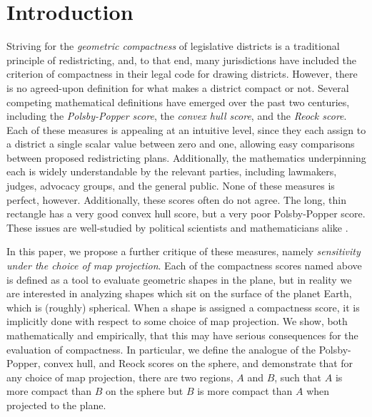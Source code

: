 \section{Introduction}\label{sec:intro}

Striving for the \textit{geometric compactness} of legislative
districts is a traditional principle of redistricting, and, to that
end, many jurisdictions have included the criterion of compactness in
their legal code for drawing districts.  However, there is no
agreed-upon definition for what makes a district compact or not.
Several competing mathematical definitions have emerged over the past
two centuries, including the \textit{Polsby-Popper score}, 
the \textit{convex hull score}, and the \textit{Reock score}.  
Each of these
measures is appealing at an intuitive level, since they each assign to
a district a single scalar value between zero and one, allowing easy
comparisons between proposed redistricting plans. Additionally, the
mathematics underpinning each is widely understandable by the relevant
parties, including lawmakers, judges, advocacy groups, and the general
public.  None of these measures is perfect, however\cit.
Additionally, these scores often do not agree.
The long, thin rectangle has a very good convex hull score, but a very
poor Polsby-Popper score.  These issues are well-studied by political
scientists and mathematicians alike
\cite{polsby1991third,frolov1975shape,maceachren1985compact}.

In this paper, we propose a further critique of these measures, namely
\textit{sensitivity under the choice of map projection}.  Each of the
compactness scores named above is defined as a tool to evaluate
geometric shapes in the plane, but in reality we are interested in
analyzing shapes which sit on the surface of the planet Earth, which
is (roughly) spherical\cit.  When a shape is assigned a compactness score,
it is implicitly done with respect to some choice of map projection.
We show, both mathematically and empirically, that this may have
serious consequences for the evaluation of compactness.  In
particular, we define the analogue of the Polsby-Popper, convex hull,
and Reock scores on the sphere, and demonstrate that for any choice of
map projection, there are two regions, $A$ and $B$, such that $A$ is
more compact than $B$ on the sphere but $B$ is more compact than $A$
when projected to the plane.
